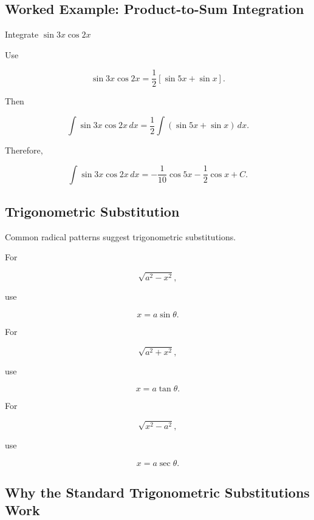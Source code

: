 \subsection{Worked Example: Product-to-Sum Integration}
\label{subsec:worked-product-to-sum-integration}

\begin{workedexamplebox}{Integrate \(\sin3x\cos2x\)}

Use

\[
\sin3x\cos2x
=
\frac12
[
\sin5x+\sin x
].
\]

Then

\[
\int
\sin3x\cos2x
\,dx
=
\frac12
\int
(\sin5x+\sin x)
\,dx.
\]

Therefore,

\begin{answerbox}
\[
\boxed{
\int
\sin3x\cos2x
\,dx
=
-\frac1{10}\cos5x
-
\frac12\cos x
+
C.
}
\]
\end{answerbox}

\end{workedexamplebox}

\subsection{Trigonometric Substitution}
\label{subsec:trigonometric-substitution-reference}

Common radical patterns suggest trigonometric substitutions.

For

\[
\boxed{
\sqrt{a^2-x^2},
}
\]

use

\[
\boxed{
x=a\sin\theta.
}
\]

For

\[
\boxed{
\sqrt{a^2+x^2},
}
\]

use

\[
\boxed{
x=a\tan\theta.
}
\]

For

\[
\boxed{
\sqrt{x^2-a^2},
}
\]

use

\[
\boxed{
x=a\sec\theta.
}
\]

\subsection{Why the Standard Trigonometric Substitutions Work}
\label{subsec:why-trig-substitution-works}


